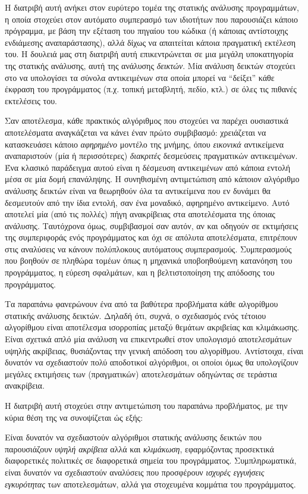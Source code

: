 Η διατριβή αυτή ανήκει στον ευρύτερο τομέα της στατικής ανάλυσης προγραμμάτων, η οποία στοχεύει στον αυτόματο συμπερασμό των ιδιοτήτων που παρουσιάζει κάποιο πρόγραμμα, με βάση την εξέταση του πηγαίου του κώδικα (ή κάποιας αντίστοιχης ενδιάμεσης αναπαράστασης), αλλά δίχως να απαιτείται κάποια πραγματική εκτέλεση του. Η δουλειά μας στη διατριβή αυτή επικεντρώνεται σε μια μεγάλη υποκατηγορία της στατικής ανάλυσης, αυτή της ανάλυσης \emph{δεικτών}. Μία ανάλυση δεικτών στοχεύει στο να υπολογίσει τα σύνολα αντικειμένων στα οποία μπορεί να ``δείξει'' κάθε έκφραση του προγράμματος (π.χ. τοπική μεταβλητή, πεδίο, κτλ.) σε όλες τις πιθανές εκτελέσεις του.

Σαν αποτέλεσμα, κάθε πρακτικός αλγόριθμος που στοχεύει να παρέχει ουσιαστικά αποτελέσματα αναγκάζεται να κάνει έναν πρώτο συμβιβασμό: χρειάζεται να κατασκευάσει κάποιο \emph{αφηρημένο} μοντέλο της μνήμης, όπου \emph{εικονικά} αντικείμενα αναπαριστούν (μία ή περισσότερες) \emph{διακριτές} δεσμεύσεις πραγματικών αντικειμένων. Ένα κλασικό παράδειγμα αυτού είναι η δέσμευση αντικειμένων από κάποια εντολή μέσα σε μία δομή επανάληψης. Η συνηθισμένη αντιμετώπιση \mbox{από} κάποιον αλγόριθμο ανάλυσης δεικτών είναι να θεωρηθούν όλα τα αντικείμενα που εν δυνάμει θα δεσμευτούν από την ίδια εντολή, σαν ένα μοναδικό, αφηρημένο αντικείμενο. Αυτό αποτελεί μία (από τις πολλές) πήγη ανακρίβειας στα αποτελέσματα της όποιας ανάλυσης. Ταυτόχρονα όμως, συμβιβασμοί σαν αυτόν, αν και οδηγούν σε εκτιμήσεις της συμπεριφοράς ενός προγράμματος και όχι σε απόλυτα αποτελέσματα, επιτρέπουν στις αναλύσεις να κάνουν πολύπλοκους αυτόματους συμπερασμούς. Συμπερασμούς που βοηθούν σε πληθώρα τομέων όπως η μηχανικά υποβοηθούμενη κατανόηση του προγράμματος, η εύρεση σφαλμάτων, και η βελτιστοποίηση της απόδοσης του προγράμματος.

Τα παραπάνω φανερώνουν ένα από τα βαθύτερα προβλήματα κάθε αλγορίθμου στατικής ανάλυσης δεικτών. Δηλαδή ότι, συχνά, ο σχεδιασμός ενός τέτοιου αλγορίθμου είναι αποτέλεσμα ισορροπίας μεταξύ θεμάτων ακριβείας και κλιμάκωσης. Είναι σχετικά απλό μία ανάλυση να επικεντρωθεί στον υπολογισμό αποτελεσμάτων υψηλής ακρίβειας, θυσιάζοντας την γενική απόδοση του αλγορίθμου. Αντίστοιχα, είναι δυνατόν να σχεδιαστούν πολύ αποδοτικοί αλγόριθμοι, οι \mbox{οποίοι} όμως θα υπολογίζουν μεγάλες εκτιμήσεις των (πραγματικών) αποτελεσμάτων οδηγώντας σε τεράστια ανακρίβεια.

Η διατριβή αυτή στοχεύει στην αντιμετώπιση του παραπάνω προβλήματος, με την κύρια θέση της να συνοψίζεται ώς εξής:

\begin{displayquote}
Είναι δυνατόν να σχεδιαστούν αλγόριθμοι στατικής ανάλυσης δεικτών που παρουσιάζουν \emph{υψηλή ακρίβεια} αλλά και \emph{κλιμάκωση}, εφαρμόζοντας προσεκτικά διαφορετικές πολιτικές σε διαφορετικά σημεία του προγράμματος. Συμπληρωματικά, είναι δυνατόν να σχεδιαστούν αναλύσεις που προσφέρουν \emph{ισχυρές εγγυήσεις εγκυρότητας} των αποτελεσμάτων, αλλά για στοχευμένα κομμάτια του προγράμματος.
\end{displayquote}

